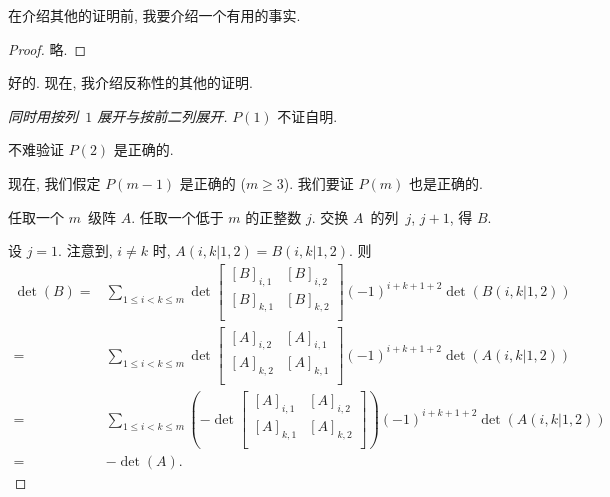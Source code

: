 在介绍其他的证明前, 我要介绍一个有用的事实.

\TheoremSwapTwoAdjacentColumns*

\begin{proof}
    略.
\end{proof}

好的.
现在, 我介绍反称性的其他的证明.

\begin{proof}[同时用按列~\(1\) 展开与按前二列展开]
    \(P(1)\) 不证自明.

    不难验证 \(P(2)\) 是正确的.

    现在, 我们假定 \(P(m-1)\) 是正确的 (\(m \geq 3\)).
    我们要证 \(P(m)\) 也是正确的.

    任取一个 \(m\)~级阵 \(A\).
    任取一个低于 \(m\) 的正整数 \(j\).
    交换 \(A\)~的列~\(j\), \(j+1\), 得 \(B\).

    设 \(j = 1\).
    注意到, \(i \neq k\) 时,
    \(A(i,k|1,2) = B(i,k|1,2)\).
    则
    \begin{align*}
        \det {(B)}
        = {} &
        \sum_{1 \leq i < k \leq m}
        {\det {
                \begin{bmatrix}
                    [B]_{i,1} & [B]_{i,2} \\
                    [B]_{k,1} & [B]_{k,2} \\
                \end{bmatrix}
            }
            (-1)^{i+k+1+2}
            \det {(B(i,k|1,2))}}
        \\
        = {} &
        \sum_{1 \leq i < k \leq m}
        {\det {
                \begin{bmatrix}
                    [A]_{i,2} & [A]_{i,1} \\
                    [A]_{k,2} & [A]_{k,1} \\
                \end{bmatrix}
            }
            (-1)^{i+k+1+2}
            \det {(A(i,k|1,2))}}
        \\
        = {} &
        \sum_{1 \leq i < k \leq m}
        {\left(-\det {
                \begin{bmatrix}
                    [A]_{i,1} & [A]_{i,2} \\
                    [A]_{k,1} & [A]_{k,2} \\
                \end{bmatrix}
            }\right)
            (-1)^{i+k+1+2}
            \det {(A(i,k|1,2))}}
        \\
        = {} & {-\det {(A)}}.
    \end{align*}


\end{proof}
